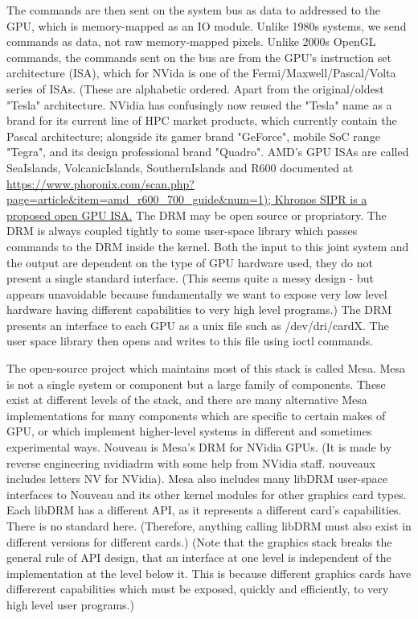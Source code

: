 \documentclass[oneside,english]{scrbook}
\begin{document}
The commands are then sent on the system bus as data to addressed to the GPU, which is memory-mapped as an IO module.  Unlike 1980s systems, we send commands as data, not raw memory-mapped pixels.  Unlike 2000s OpenGL commands, the commands sent on the bus are from the GPU's instruction set architecture (ISA), which for NVida is one of the Fermi/Maxwell/Pascal/Volta series of ISAs. (These are alphabetic ordered. Apart from the original/oldest "Tesla" architecture. NVidia has confusingly now reused the "Tesla" name as a brand for its current line of HPC market products, which currently contain the Pascal architecture; alongside its gamer brand "GeForce", mobile SoC range "Tegra", and its design professional brand "Quadro".   AMD's GPU ISAs are called SeaIslands, VolcanicIslands, SouthernIslands and R600 documented at \url{https://www.phoronix.com/scan.php?page=article&item=amd_r600_700_guide&num=1); Khronos SIPR is a proposed open GPU ISA.} The DRM may be open source or propriatory.  The DRM is always coupled tightly to some user-space library which passes commands to the DRM inside the kernel.  Both the input to this joint system and the output are dependent on the type of GPU hardware used, they do not present a single standard interface. (This seems quite a messy design - but appears unavoidable because fundamentally we want to expose very low level hardware having different capabilities to very high level programs.)  The DRM presents an interface to each GPU as a unix file such as /dev/dri/cardX.  The user space library then opens and writes to this file using ioctl commands.

The open-source project which maintains most of this stack is called Mesa. Mesa is not a single system or component but a large family of components. These exist at different levels of the stack, and there are many alternative Mesa implementations for many components which are specific to certain makes of GPU, or which implement higher-level systems in different and sometimes experimental ways.   Nouveau is Mesa's DRM for NVidia GPUs. (It is made by reverse engineering nvidiadrm with some help from NVidia staff. nouveaux includes letters NV for NVidia).  Mesa also includes many libDRM user-space interfaces to Nouveau and its other kernel modules for other graphics card types.   Each libDRM has a different API, as it represents a different card's capabilities. There is no standard here. (Therefore, anything calling libDRM must also exist in different versions for different cards.) (Note that the graphics stack breaks the general rule of API design, that an interface at one level is independent of the implementation at the level below it.  This is because different graphics cards have differerent capabilities which must be exposed, quickly and efficiently, to very high level user programs.)
\end{document}
